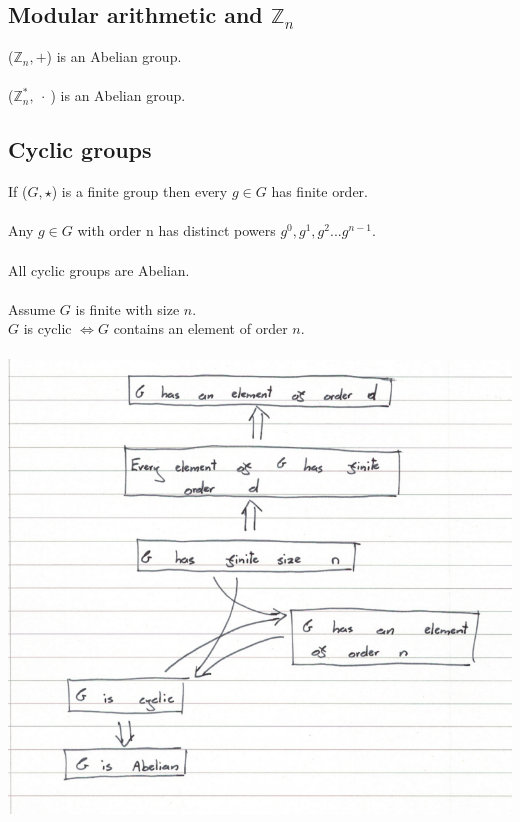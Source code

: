 \documentclass{article}
\newcommand{\Z}{\mathbb{Z}}
\begin{document}
\subsection{Modular arithmetic and $ \Z_{n} $}
($ \Z_{n}, + $) is an Abelian group.
\\\\
($ \Z_{n}^{*}, \ \cdot \ $) is an Abelian group.

\subsection{Cyclic groups}
If ($ G, \star $) is a finite group then every $ g \in G $ has finite order.
\\\\
Any $ g \in G $ with order n has distinct powers $ g^{0}, g^{1}, g^{2}...g^{n - 1} $.
\\\\
All cyclic groups are Abelian.
\\\\
Assume $ G $ is finite with size $ n $. \\
$ G $ is cyclic $ \Leftrightarrow G $ contains an element of order $ n $.
\\\\
\includegraphics[scale=0.4]{cyclic_groups}
\end{document}
